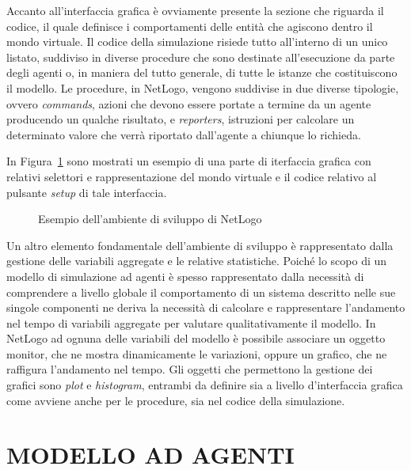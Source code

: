 \documentclass[12pt,a4paper,openright,twoside]{report}
\begin{document}
Accanto all'interfaccia grafica è ovviamente presente la sezione che riguarda il codice, il quale definisce i comportamenti delle entità  che agiscono dentro il mondo virtuale. Il codice della simulazione risiede tutto all'interno di un unico listato, suddiviso in diverse procedure che sono destinate all'esecuzione da parte degli agenti o, in maniera del tutto generale, di tutte le istanze che costituiscono il modello. Le procedure, in NetLogo, vengono suddivise in due diverse tipologie, ovvero \emph{commands}, azioni che devono essere portate a termine da un agente producendo un qualche risultato, e \emph{reporters}, istruzioni per calcolare un determinato valore che verrà riportato dall'agente a chiunque lo richieda. 

In Figura~\ref{netlogoUI_code} sono mostrati un esempio di una parte di iterfaccia grafica con relativi selettori e rappresentazione del mondo virtuale e il codice relativo al pulsante \emph{setup} di tale interfaccia.

\begin{figure}[H]
	\centering
	\quad 
	\caption{Esempio dell'ambiente di sviluppo di NetLogo}
	\label{netlogoUI_code}
\end{figure}

Un altro elemento fondamentale dell'ambiente di sviluppo è rappresentato dalla gestione delle variabili aggregate e le relative statistiche. Poiché lo scopo di un modello di simulazione ad agenti è spesso rappresentato dalla necessità di comprendere a livello globale il comportamento di un sistema descritto nelle sue singole componenti ne deriva la necessità di calcolare e rappresentare l'andamento nel tempo di variabili aggregate per valutare qualitativamente il modello. In NetLogo ad ognuna delle variabili del modello è possibile associare un oggetto monitor, che ne mostra dinamicamente le variazioni, oppure un grafico, che ne raffigura l'andamento nel tempo. Gli  oggetti che permettono la gestione dei grafici sono \emph{plot} e \emph{histogram}, entrambi da definire sia a livello d'interfaccia grafica come avviene anche per le procedure, sia nel codice della simulazione.


\section{MODELLO AD AGENTI}
\end{document}
